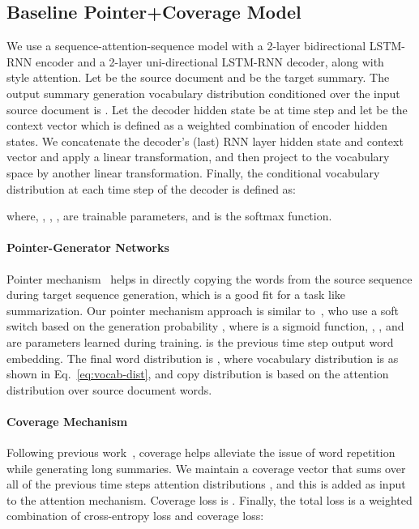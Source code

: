 \documentclass[11pt,a4paper]{article}
\begin{document}
\subsection{Baseline Pointer+Coverage Model}
\label{subsec:attention-model}
We use a sequence-attention-sequence model with a 2-layer bidirectional LSTM-RNN encoder and a 2-layer uni-directional LSTM-RNN decoder, along with~ style attention. Let  be the source document and  be the target summary. The output summary generation vocabulary distribution conditioned over the input source document is .
Let the decoder hidden state be  at time step  and let  be the context vector which is defined as a weighted combination of encoder hidden states. We concatenate the decoder's (last) RNN layer hidden state  and context vector  and apply a linear transformation, and then project to the vocabulary space by another linear transformation. Finally, the conditional vocabulary distribution at each time step  of the decoder is defined as: 

where, , , ,  are trainable parameters, and  is the softmax function. 


\paragraph{Pointer-Generator Networks}
\label{subsec:pointer-model}
Pointer mechanism~\cite{vinyals2015pointer} helps in directly copying the words from the source sequence during target sequence generation, which is a good fit for a task like summarization. Our pointer mechanism approach is similar to~, who use a soft switch based on the generation probability , where  is a sigmoid function, , ,  and  are parameters learned during training.  is the previous time step output word embedding. The final word distribution is , where  vocabulary distribution is as shown in Eq.~\ref{eq:vocab-dist}, and copy distribution  is based on the attention distribution over source document words. 
\paragraph{Coverage Mechanism}
\label{subsec:coverage-mechanisml}
Following previous work~\cite{see2017get}, coverage helps alleviate the issue of word repetition while generating long summaries. We maintain a coverage vector  that sums over all of the previous time steps attention distributions , and this is added as input to the attention mechanism. Coverage loss is . 
Finally, the total loss is a weighted combination of cross-entropy loss and coverage loss: 
\vspace{-5pt}
\end{document}

